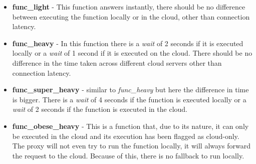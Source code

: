 \begin{itemize}
    \item \textbf{func\_light} - This function answers instantly, there should be
        no difference between executing the function locally or in the cloud,
        other than connection latency.
    \item \textbf{func\_heavy} - In this function there is a \textit{wait} of 2 seconds if
        it is executed locally or a \textit{wait} of 1 second if it is executed on the cloud. There should be no difference in the time taken across different cloud servers other than connection latency.
    \item \textbf{func\_super\_heavy} - similar to \textit{func\_heavy} but here the difference in time is bigger. There is a \textit{wait} of 4 seconds if the function is executed locally or a \textit{wait} of 2 seconds if the function is executed in the cloud.
    \item \textbf{func\_obese\_heavy} - This is a function that, due to its nature, it can
        only be executed in the cloud and its execution has been flagged as cloud-only. The proxy will not even try to run the function locally, it will always forward the request to the cloud. Because of this, there is no fallback to run locally.
\end{itemize}
